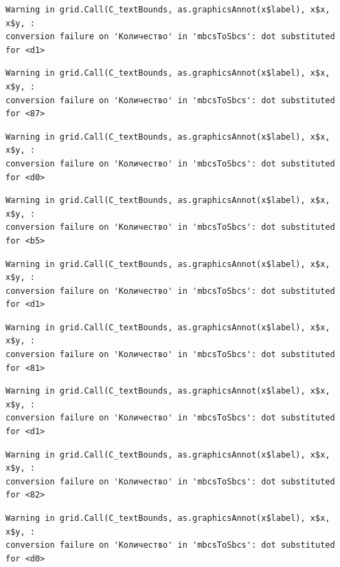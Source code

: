 \documentclass[
  letterpaper,
  DIV=11,
  numbers=noendperiod]{scrreprt}
\theoremstyle{definition}
\theoremstyle{remark}
\begin{document}
\begin{verbatim}
Warning in grid.Call(C_textBounds, as.graphicsAnnot(x$label), x$x, x$y, :
conversion failure on 'Количество' in 'mbcsToSbcs': dot substituted for <d1>
\end{verbatim}

\begin{verbatim}
Warning in grid.Call(C_textBounds, as.graphicsAnnot(x$label), x$x, x$y, :
conversion failure on 'Количество' in 'mbcsToSbcs': dot substituted for <87>
\end{verbatim}

\begin{verbatim}
Warning in grid.Call(C_textBounds, as.graphicsAnnot(x$label), x$x, x$y, :
conversion failure on 'Количество' in 'mbcsToSbcs': dot substituted for <d0>
\end{verbatim}

\begin{verbatim}
Warning in grid.Call(C_textBounds, as.graphicsAnnot(x$label), x$x, x$y, :
conversion failure on 'Количество' in 'mbcsToSbcs': dot substituted for <b5>
\end{verbatim}

\begin{verbatim}
Warning in grid.Call(C_textBounds, as.graphicsAnnot(x$label), x$x, x$y, :
conversion failure on 'Количество' in 'mbcsToSbcs': dot substituted for <d1>
\end{verbatim}

\begin{verbatim}
Warning in grid.Call(C_textBounds, as.graphicsAnnot(x$label), x$x, x$y, :
conversion failure on 'Количество' in 'mbcsToSbcs': dot substituted for <81>
\end{verbatim}

\begin{verbatim}
Warning in grid.Call(C_textBounds, as.graphicsAnnot(x$label), x$x, x$y, :
conversion failure on 'Количество' in 'mbcsToSbcs': dot substituted for <d1>
\end{verbatim}

\begin{verbatim}
Warning in grid.Call(C_textBounds, as.graphicsAnnot(x$label), x$x, x$y, :
conversion failure on 'Количество' in 'mbcsToSbcs': dot substituted for <82>
\end{verbatim}

\begin{verbatim}
Warning in grid.Call(C_textBounds, as.graphicsAnnot(x$label), x$x, x$y, :
conversion failure on 'Количество' in 'mbcsToSbcs': dot substituted for <d0>
\end{verbatim}
\end{document}
